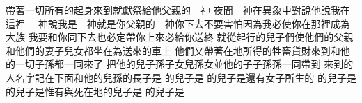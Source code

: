 \bchapter%
帶著一切所有的\chientien 起身來到\chientien 就獻祭給他父親的　神\chuan 
{}夜間　神在異象中對說\chientien{}\chientien{}\yuentien 他說\chientien 我在這裡\chuan 
{}　神說\chientien 我是　神\chientien 就是你父親的　神\chientien 你下去不要害怕\chientien 因為我必使你在那裡成為大族\chuan 
{}我要和你同下去\chientien 也必定帶你上來\yuentien{}必給你送終\chuan{}\linebreak{}
就從起行\yuentien{}的兒子們使他們的父親\chientien 和他們的妻子\chientien 兒女\chientien 都坐在為送來的車上\chuan 
{}他們又帶著在地所得的牲畜\chientien 貨財\chientien 來到\yuentien{}和他的一切子孫都一同來了\chuan 
{}把他的兒子\chientien 孫子\chientien 女兒\chientien 孫女\chientien 並他的子子孫孫\chientien 一同帶到\chuan\Chuan
{}來到的人\chientien 名字記在下面\yuentien{}和他的兒孫\chientien{}的長子是\chuan 
{}的兒子是\chientien{}\chientien{}\chientien{}\chuan 
{}的兒子是\chientien{}\chientien{}\chientien{}\chientien{}\yuentien 還有女子所生的\chuan 
{}的兒子是\chientien{}\chientien{}\chuan 
{}的兒子是\chientien{}\chientien{}\chientien{}\chientien{}\yuentien 惟有與死在地\chuan{}的兒子是\chientien{}\chuan 
{}\linebreak 的兒子是\chientien{}\chientien{}\chientien{}\chuan 
